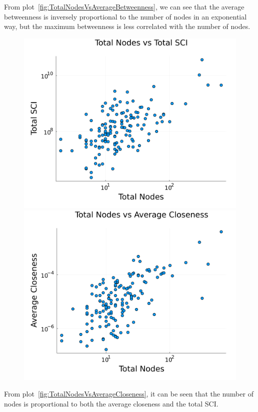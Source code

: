 From plot~\ref{fig:TotalNodesVsAverageBetweenness}, we can see that the average betweenness is inversely proportional to the number of nodes in an exponential way, but the maximum betweenness is less correlated with the number of nodes.

\begin{figure}[H]
    \centering
    \begin{minipage}{0.48\textwidth}
        \centering
        \includegraphics[width=1\textwidth]{images/task44/TotalNodesVsTotalSCI.png}
    \end{minipage}
    \begin{minipage}{0.5\textwidth}
        \centering
        \includegraphics[width=1\textwidth]{images/task44/TotalNodesVsAverageCloseness.png}
    \end{minipage}
    \caption{}
    \label{fig:TotalNodesVsAverageCloseness}
    \label{fig:TotalNodesVsTotalSCI}
\end{figure}

From plot~\ref{fig:TotalNodesVsAverageCloseness}, it can be seen that the number of nodes is proportional to both the average closeness and the total SCI.

\newpage